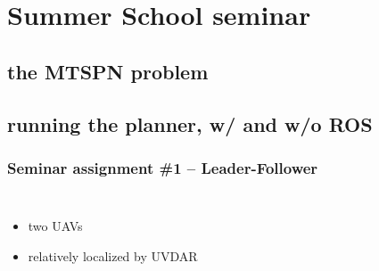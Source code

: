 \documentclass[aspectratio=1610]{beamer}
\begin{document}

  \section{Summer School seminar}
  \subsection{the MTSPN problem}
  \subsection{running the planner, w/ and w/o ROS}


  \begin{frame}
    \frametitle{Seminar assignment \#1 -- Leader-Follower}

    \begin{columns}[c]
    
   
      \begin{itemize}
        \item two UAVs
        \item relatively localized by UVDAR
      \end{itemize}
    
    
    \end{columns}

  \end{frame}


\end{document}
